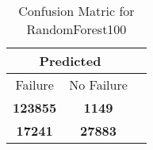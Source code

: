 \begin{table}[] 
\caption{Confusion Matric for RandomForest100} 
\label{Table: Prediction Accuracy-DMDRandomForest100OnlySunEKF-resetReflectionEKF-top2perfectNoFailurePrediction-Reflection} 
\centering 
\begin{tabular} 
 {@{}ccc@{}} 
\toprule 
\multicolumn{2}{c}{\textbf{Predicted}}
 \\ \midrule 
\multicolumn{1}{|c|}{Failure} & 
\multicolumn{1}{c|}{No Failure}
 \\ \midrule 
\multicolumn{1}{|c|}{\color{green}\textbf{123855}} & 
\multicolumn{1}{c|}{\color{red}\textbf{1149}}
 \\ \midrule 
\multicolumn{1}{|c|}{\color{red}\textbf{17241}} & 
\multicolumn{1}{c|}{\color{green}\textbf{27883}}
 \\ \bottomrule 
\end{tabular} 
\end{table} 
